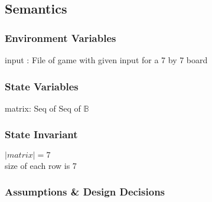 \documentclass[12pt]{article}
\begin{document}
\subsection* {Semantics}

\subsubsection* {Environment Variables}

input : File of game with given input for a 7 by 7 board

\subsubsection* {State Variables}

matrix: Seq of Seq of $\mathbb{B}$ 

\subsubsection* {State Invariant}

$|matrix| = 7$\\
size of each row is 7\\

\newpage

\subsubsection* {Assumptions \& Design Decisions}
\end{document}
